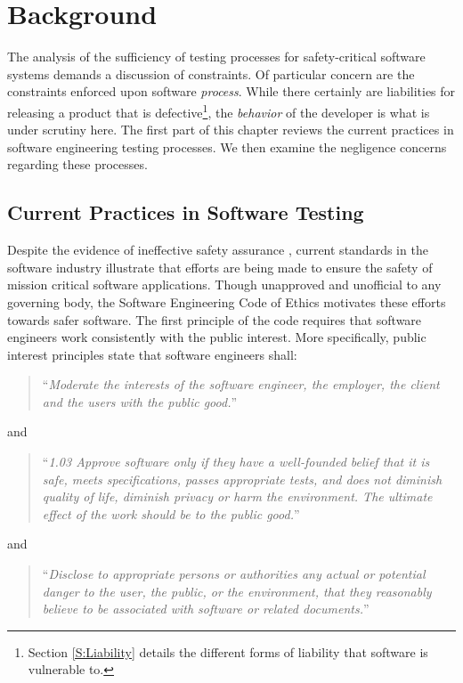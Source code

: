 \chapter{Background}\label{C:Background}
The analysis of the sufficiency of testing processes for safety-critical
software systems demands a discussion of constraints. Of particular concern are
the constraints enforced upon software \textit{process}. While there certainly
are liabilities for releasing a product that is defective\footnote{Section 
\ref{S:Liability} details the different forms of liability that software is
vulnerable to.}, the \textit{behavior} of the developer is what is under
scrutiny here. The first part of this chapter reviews the current practices in
software engineering testing processes. We then examine the negligence concerns
regarding these processes.

\section{Current Practices in Software Testing}
Despite the evidence of ineffective safety assurance \cite{Leveson93,Maisel05},
current standards in the software industry illustrate that efforts are being
made to ensure the safety of mission critical software applications. Though
unapproved and unofficial to any governing body, the Software Engineering Code
of Ethics motivates these efforts towards safer software. The first principle of
the code requires that software engineers work consistently with the public
interest. More specifically, public interest principles state that software
engineers shall: 

\begin{quote}
``\textit{Moderate the interests of the software engineer, the employer, the
client and the users with the public good.}''\cite{SECODE}
\end{quote}
and
\begin{quote}
``\textit{1.03 Approve software only if they have a well-founded belief that it
is safe, meets specifications, passes appropriate tests, and does not diminish
quality of life, diminish privacy or harm the environment. The ultimate effect
of the work should be to the public good.}''\cite{SECODE}
\end{quote}
and
\begin{quote}
``\textit{Disclose to appropriate persons or authorities any actual or
potential danger to the user, the public, or the environment, that they
reasonably believe to be associated with software or related
documents.}''\cite{SECODE}
\end{quote}

